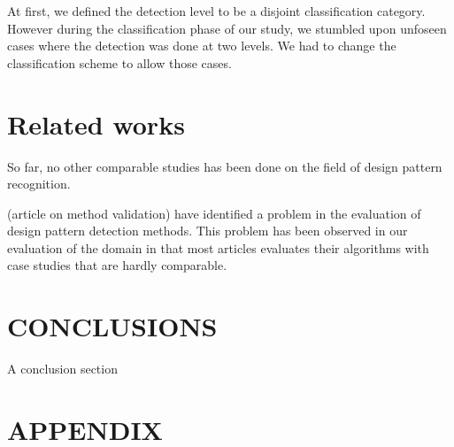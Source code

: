 \documentclass[letterpaper, 10 pt, conference]{ieeeconf}  %
\begin{document}
At first, we defined the detection level to be a disjoint classification category.
However during the classification phase of our study, we stumbled upon unfoseen cases
where the detection was done at two levels. We had to change the classification
scheme to allow those cases.



\section{Related works}



So far, no other comparable studies has been done on the field of design pattern
recognition.

(article on method validation) have identified a problem in the evaluation of design
pattern detection methods. This problem has been observed in our evaluation of the
domain in that most articles evaluates their algorithms with case studies that are
hardly comparable.




\section{CONCLUSIONS}

A conclusion section 



\addtolength{\textheight}{-12cm}   








\section*{APPENDIX}
\end{document}
